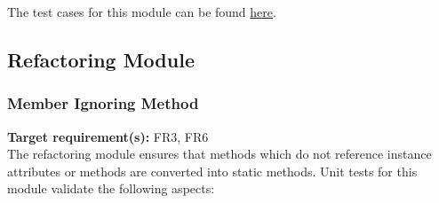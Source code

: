 \documentclass[12pt, titlepage]{article}
\begin{document}
\noindent The test cases for this module can be found \href{https://github.com/ssm-lab/capstone--source-code-optimizer/blob/new-poc/tests/api/test_refactoring.py}{here}.



\subsection{Refactoring Module}

\subsubsection{Member Ignoring Method}

\textbf{Target requirement(s):} FR3, FR6~\cite{SRS} \\

\noindent
The refactoring module ensures that methods which do not reference instance attributes or methods are converted into static methods. Unit tests for this module validate the following aspects:
\end{document}
